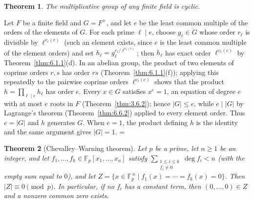 \documentclass[11pt]{article}
\makeatletter
\let\nt@closedisplay\]
\def\nt@guardedclose{\@ifnextchar\par{\nt@closeafterpar}{\@ifnextchar\end{\postdisplaypenalty\@M\nt@closedisplay}{\nt@closedisplay}}}
\def\nt@closeafterpar\par{\@ifnextchar\par{\nt@closeafterpar}{\@ifnextchar\end{\postdisplaypenalty\@M\nt@closedisplay\par}{\nt@closedisplay\par}}}
\renewenvironment{proof}[1][\proofname]{\par
  \pushQED{\qed}\normalfont\topsep\medskipamount\edef\nt@afterproof{\@endparpenalty=\the\@endparpenalty\relax}\@beginparpenalty\@M\@endparpenalty\@M\let\]\nt@guardedclose\trivlist\item[]\textit{#1\@addpunct{.}} \ignorespaces}{\ifvmode\addpenalty\@M\fi\popQED\nt@afterproof\endtrivlist\@endpefalse}
\theoremstyle{ntstyle}
\newtheorem{theorem}{Theorem}[subsection]
\makeatother
\begin{document}
\begin{theorem}\label{thm:6.10.1} The multiplicative group of any finite
  field is cyclic.

\end{theorem}

\begin{proof} Let $F$ be a finite field and $G=F^{\times}$, and let
  $e$ be the least common multiple of the orders of the elements of $G$. For
  each prime $\ell\mid e$, choose $g_\ell\in G$ whose order $r_\ell$ is
  divisible by $\ell^{v_\ell(e)}$ (such an element exists, since $e$ is the least
  common multiple of the element orders) and set
  $h_\ell=g_\ell^{r_\ell/\ell^{v_\ell(e)}}$; then $h_\ell$ has exact order
  $\ell^{v_\ell(e)}$ by Theorem~\ref{thm:6.1.1}(d). In an abelian group, the
  product of two elements of coprime orders $r,s$ has order $rs$
  (Theorem~\ref{thm:6.1.1}(f)); applying this repeatedly to the pairwise coprime orders
  $\ell^{v_\ell(e)}$ shows that the product $h=\prod_{\ell\mid e}h_\ell$ has order $e$.
  Every $x\in G$ satisfies $x^{e}=1$, an equation of degree $e$ with at most
  $e$ roots in $F$ (Theorem~\ref{thm:3.6.2}); hence $|G|\le e$, while
  $e\mid|G|$ by Lagrange's theorem (Theorem~\ref{thm:6.6.2}) applied to every element order. Thus $e=|G|$ and $h$
  generates $G$. When $e=1$, the product defining $h$ is the identity and the same argument gives $|G|=1$.
\end{proof}

\begin{theorem}[Chevalley--Warning theorem]\label{thm:6.10.2}\label{thm:chevalley-warning-theorem}
  Let $p$ be a prime,
  let $n\ge1$ be an integer, and let $f_1, \ldots, f_k \in \mathbb{F}_p[x_1, \ldots, x_n]$ satisfy
  $\sum_{\substack{1\le i\le k\\ f_i\neq0}} \deg f_i < n$ (with the
  empty sum equal to $0$), and let $Z = \{x \in \mathbb{F}_p^{\,n} \mid f_1(x) = \cdots = f_k(x) = 0\}$. Then
  $|Z| \equiv 0 \pmod{p}$. In particular, if no $f_i$ has a constant term, then $(0,\ldots,0)\in Z$ and a nonzero
  common zero exists.

\end{theorem}
\end{document}
